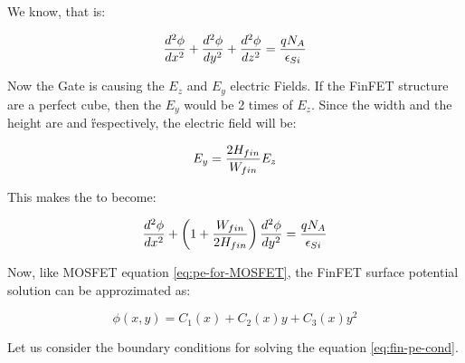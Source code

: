 \documentclass[a4paper]{article}
\begin{document}
We know, that \PE is:

\begin{equation}
  \frac {d^2\phi} {dx^2} + \frac {d^2\phi} {dy^2} + \frac {d^2\phi} {dz^2} = \frac{qN_A} {\epsilon_{Si}}
\end{equation}

Now the Gate is causing the $E_z$ and $E_y$ electric Fields. If the FinFET structure are a perfect cube, then the $E_y$ would be 2 times of $E_z$. Since the width and the height are \W and \H respectively, the electric field will be:

\begin{align*}
  E_y = \frac{2H_{fin}}{W_{fin}} E_z
\end{align*}

This makes the \PE to become:

\begin{equation}
  \label{eq:pe-finFET}
  \frac {d^2\phi} {dx^2} + \left( 1 + \frac{W_{fin}}{2 H_{fin}} \right) \frac {d^2\phi} {dy^2} = \frac{qN_A} {\epsilon_{Si}}
\end{equation}

Now, like MOSFET equation \ref{eq:pe-for-MOSFET}, the FinFET surface potential solution can be approzimated as:

\begin{equation}
  \label{eq:fin-pe-cond}
  \phi(x,y) = C_1(x) + C_2(x)y  + C_3(x)y^2
\end{equation}

Let us consider the boundary conditions for solving the equation \ref{eq:fin-pe-cond}.
\end{document}
